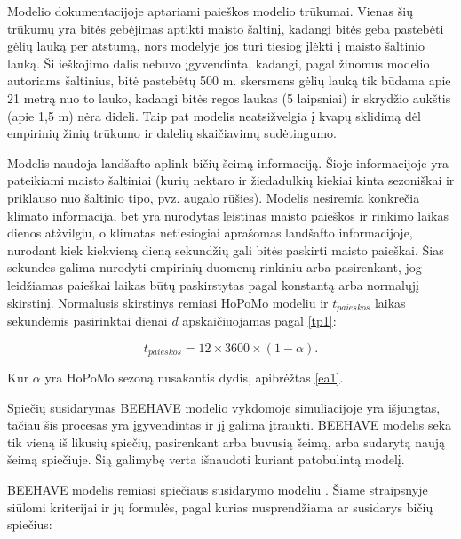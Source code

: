 \documentclass{VUMIFKompMagistrinis}
\begin{document}
Modelio dokumentacijoje aptariami paieškos modelio trūkumai. Vienas šių trūkumų yra bitės gebėjimas aptikti maisto šaltinį, kadangi bitės geba pastebėti gėlių lauką per atstumą, nors modelyje jos turi tiesiog įlėkti į maisto šaltinio lauką. Ši ieškojimo dalis nebuvo įgyvendinta, kadangi, pagal žinomus modelio autoriams šaltinius, bitė pastebėtų 500 m. skersmens gėlių lauką tik būdama apie 21 metrą nuo to lauko, kadangi bitės regos laukas (5 laipsniai) ir skrydžio aukštis (apie 1,5 m) nėra dideli. Taip pat modelis neatsižvelgia į kvapų sklidimą dėl empirinių žinių trūkumo ir dalelių skaičiavimų sudėtingumo.






Modelis naudoja landšafto aplink bičių šeimą informaciją. Šioje informacijoje yra pateikiami maisto šaltiniai (kurių nektaro ir žiedadulkių kiekiai kinta sezoniškai ir priklauso nuo šaltinio tipo, pvz. augalo rūšies).
Modelis nesiremia konkrečia klimato informacija, bet yra nurodytas leistinas maisto paieškos ir rinkimo laikas dienos atžvilgiu, o klimatas netiesiogiai aprašomas landšafto informacijoje, nurodant kiek kiekvieną dieną sekundžių gali bitės paskirti maisto paieškai. Šias sekundes galima nurodyti empirinių duomenų rinkiniu arba pasirenkant, jog leidžiamas paieškai laikas būtų paskirstytas pagal konstantą arba normalųjį skirstinį. Normalusis skirstinys remiasi HoPoMo modeliu ir $t_{paieskos}$ laikas sekundėmis pasirinktai dienai $d$ apskaičiuojamas pagal \eqref{tp1}:
\newpage

\begin{equation}\label{tp1}
t_{paieskos}= 12×3600×(1-\alpha).
\end{equation}

Kur $\alpha$ yra HoPoMo sezoną nusakantis dydis, apibrėžtas \eqref{ea1}.



Spiečių susidarymas BEEHAVE modelio vykdomoje simuliacijoje yra išjungtas, tačiau šis procesas yra įgyvendintas ir jį galima įtraukti. BEEHAVE modelis seka tik vieną iš likusių spiečių, pasirenkant arba buvusią šeimą, arba sudarytą naują šeimą spiečiuje. Šią galimybę verta išnaudoti kuriant patobulintą modelį.

BEEHAVE modelis remiasi spiečiaus susidarymo modeliu \cite{FeS06}. Šiame straipsnyje siūlomi kriterijai ir jų formulės, pagal kurias nusprendžiama ar susidarys bičių spiečius:
\end{document}

